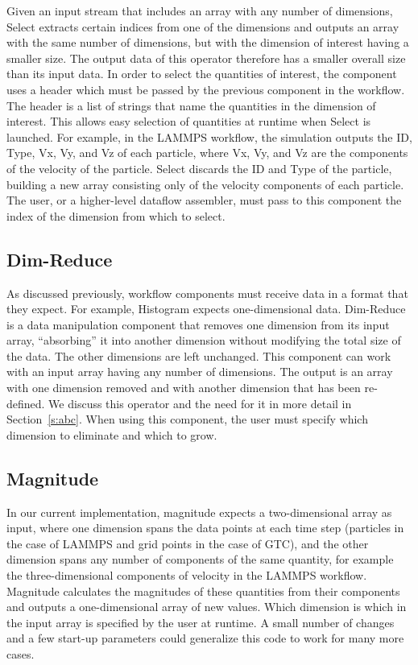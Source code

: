 \documentclass[conference]{IEEEtran}
\begin{document}
Given an input stream that includes an array with any number of dimensions,
Select extracts certain indices from one of the dimensions and outputs an array
with the same number of dimensions, but with the dimension of interest having a
smaller size. The output data of this operator therefore has a smaller overall
size than its input data. In order to select the quantities of interest, the
component uses a header which must be passed by the previous component in the
workflow. The header is a list of strings that name the quantities in the
dimension of interest. This allows easy selection of quantities at runtime when
Select is launched. For example, in the LAMMPS workflow, the simulation outputs
the ID, Type, Vx, Vy, and Vz of each particle, where Vx, Vy, and Vz are the
components of the velocity of the particle. Select discards the ID and Type of
the particle, building a new array consisting only of the velocity components
of each particle. The user, or a higher-level dataflow assembler, must pass to
this component the index of the dimension from which to select.

\subsection{Dim-Reduce}

As discussed previously, workflow components must receive data in a format
that they expect. For example, Histogram expects one-dimensional data.
Dim-Reduce is a data manipulation component that removes one dimension from its
input array, ``absorbing'' it into another dimension without modifying the
total size of the data. The other dimensions are left unchanged. This component
can work with an input array having any number of dimensions. The output is an
array with one dimension removed and with another dimension that has been
re-defined. We discuss this operator and the need for it in more detail in
Section~\ref{s:abc}. When using this component, the user must specify which
dimension to eliminate and which to grow.

\subsection{Magnitude}

In our current implementation, magnitude expects a two-dimensional array as
input, where one dimension spans the data points at each time step (particles
in the case of LAMMPS and grid points in the case of GTC), and the other
dimension spans any number of components of the same quantity, for example the
three-dimensional components of velocity in the LAMMPS workflow. Magnitude
calculates the magnitudes of these quantities from their components and outputs
a one-dimensional array of new values. Which dimension is which in the input
array is specified by the user at runtime. A small number of changes and a few
start-up parameters could generalize this code to work for many more cases.
\end{document}
